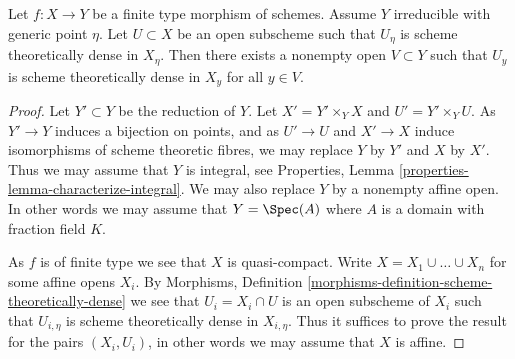 \begin{lemma}
\label{lemma-scheme-theoretically-dense-generic-fibre}
Let $f : X \to Y$ be a finite type morphism of schemes.
Assume $Y$ irreducible with generic point $\eta$.
Let $U \subset X$ be an open subscheme such that $U_\eta$ is
scheme theoretically dense in $X_\eta$.
Then there exists a nonempty open $V \subset Y$ such
that $U_y$ is scheme theoretically dense in $X_y$ for all $y \in V$.
\end{lemma}

\begin{proof}
Let $Y' \subset Y$ be the reduction of $Y$.
Let $X' = Y' \times_Y X$ and $U' = Y' \times_Y U$.
As $Y' \to Y$ induces a bijection on points, and as
$U' \to U$ and $X' \to X$ induce isomorphisms of scheme theoretic fibres,
we may replace $Y$ by $Y'$ and $X$ by $X'$.
Thus we may assume that $Y$ is integral, see
Properties, Lemma \ref{properties-lemma-characterize-integral}.
We may also replace $Y$ by a nonempty affine open. In other words we
may assume that $Y = \Spec(A)$ where $A$ is a domain with fraction
field $K$.

\medskip\noindent
As $f$ is of finite type we see that $X$ is quasi-compact.
Write $X = X_1 \cup \ldots \cup X_n$ for some affine opens $X_i$. By
Morphisms, Definition \ref{morphisms-definition-scheme-theoretically-dense}
we see that $U_i = X_i \cap U$ is an open subscheme of $X_i$ such that
$U_{i, \eta}$ is scheme theoretically dense in $X_{i, \eta}$.
Thus it suffices to prove the result for the pairs $(X_i, U_i)$,
in other words we may assume that $X$ is affine.


\end{proof}

